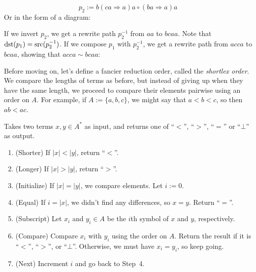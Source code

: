 \documentclass[../generics]{subfiles}
\begin{document}
\begin{example}
\[p_2 := b(ca\Rightarrow a)a\circ(ba\Rightarrow a)a\]
Or in the form of a diagram:
\begin{quote}
\end{quote}
If we invert $p_2$, we get a rewrite path $p_2^{-1}$ from $aa$ to $bcaa$. Note that $\operatorname{dst}(p_1)=\operatorname{src}(p_2^{-1})$. If we compose $p_1$ with $p_2^{-1}$, we get a rewrite path from $acca$ to $bcaa$, showing that $acca\sim bcaa$:
\begin{quote}
\end{quote}
\end{example}
%
%
Before moving on, let's define a fancier reduction order, called the \emph{shortlex order}. We compare the lengths of terms as before, but instead of giving up when they have the same length, we proceed to compare their elements pairwise using an order on $A$. For example, if $A:=\{a,b,c\}$, we might say that $a<b<c$, so then $ab<ac$.
%
\begin{algorithm}\label{shortlex}
Takes two terms $x,y\in A^*$ as input, and returns one of ``$<$'', ``$>$'', ``$=$'' or \index{$\bot$}``$\bot$'' as output.
\begin{enumerate}
\item (Shorter) If $|x|<|y|$, return ``$<$''.
\item (Longer) If $|x|>|y|$, return ``$>$''.
\item (Initialize) If $|x|=|y|$, we compare elements. Let $i:=0$.
\item (Equal) If $i=|x|$, we didn't find any differences, so $x=y$. Return ``$=$''.
\item (Subscript) Let $x_i$ and $y_i\in A$ be the $i$th symbol of $x$ and $y$, respectively.
\item (Compare) Compare $x_i$ with $y_i$ using the order on $A$. Return the result if it is ``$<$'', ``$>$'', or ``$\bot$''. Otherwise, we must have $x_i=y_i$, so keep going.
\item (Next) Increment $i$ and go back to Step~4.
\end{enumerate}
\end{algorithm}
\end{document}
